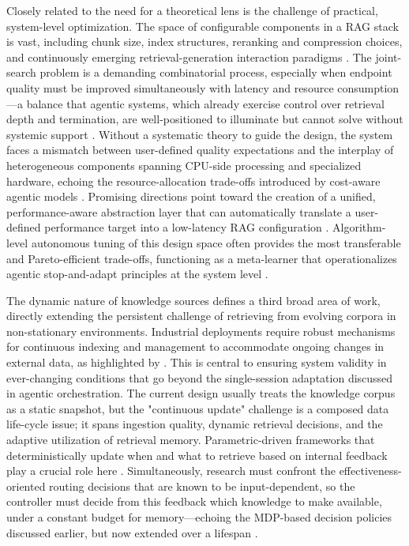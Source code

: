 \documentclass[11pt,a4paper]{article}
\begin{document}
Closely related to the need for a theoretical lens is the challenge of practical, system-level optimization. The space of configurable components in a RAG stack is vast, including chunk size, index structures, reranking and compression choices, and continuously emerging retrieval-generation interaction paradigms \cite{arxiv:2508.06401v3}. The joint-search problem is a demanding combinatorial process, especially when endpoint quality must be improved simultaneously with latency and resource consumption---a balance that agentic systems, which already exercise control over retrieval depth and termination, are well-positioned to illuminate but cannot solve without systemic support \cite{arxiv:2503.14649v2}. Without a systematic theory to guide the design, the system faces a mismatch between user-defined quality expectations and the interplay of heterogeneous components spanning CPU-side processing and specialized hardware, echoing the resource-allocation trade-offs introduced by cost-aware agentic models \cite{arxiv:2505.07833v2}. Promising directions point toward the creation of a unified, performance-aware abstraction layer that can automatically translate a user-defined performance target into a low-latency RAG configuration \cite{arxiv:2510.20296v1}. Algorithm-level autonomous tuning of this design space often provides the most transferable and Pareto-efficient trade-offs, functioning as a meta-learner that operationalizes agentic stop-and-adapt principles at the system level \cite{arxiv:2511.01386v1,arxiv:2605.08333v1}.

The dynamic nature of knowledge sources defines a third broad area of work, directly extending the persistent challenge of retrieving from evolving corpora in non-stationary environments. Industrial deployments require robust mechanisms for continuous indexing and management to accommodate ongoing changes in external data, as highlighted by \cite{arxiv:2506.03401v1}. This is central to ensuring system validity in ever-changing conditions that go beyond the single-session adaptation discussed in agentic orchestration. The current design usually treats the knowledge corpus as a static snapshot, but the "continuous update" challenge is a composed data life-cycle issue; it spans ingestion quality, dynamic retrieval decisions, and the adaptive utilization of retrieval memory. Parametric-driven frameworks that deterministically update when and what to retrieve based on internal feedback play a crucial role here \cite{arxiv:2506.06704v1}. Simultaneously, research must confront the effectiveness-oriented routing decisions that are known to be input-dependent, so the controller must decide from this feedback which knowledge to make available, under a constant budget for memory---echoing the MDP-based decision policies discussed earlier, but now extended over a lifespan \cite{arxiv:2602.00296v2}.
\end{document}
